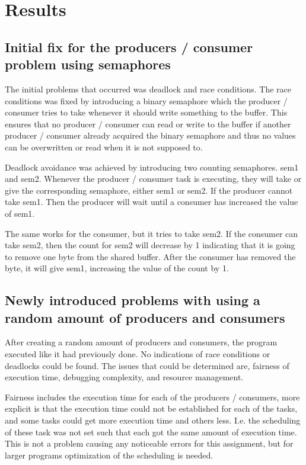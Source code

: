 \section{Results}
\label{section:results}
\subsection{Initial fix for the producers / consumer problem using semaphores}
The initial problems that occurred was deadlock and race conditions. 
The race conditions was fixed by introducing a binary semaphore which the producer / consumer tries to take whenever it should write something to the buffer. This ensures that no producer / consumer can read or write to the buffer if another producer / consumer already acquired the binary semaphore and thus no values can be overwritten or read when it is not supposed to.

Deadlock avoidance was achieved by introducing two counting semaphores. \ac{sem1} and \ac{sem2}. Whenever the producer / consumer task is executing, they will take or give the corresponding semaphore, either \ac{sem1} or \ac{sem2}. If the producer cannot take \ac{sem1}. Then the producer will wait until a consumer has increased the value of \ac{sem1}.

The same works for the consumer, but it tries to take \ac{sem2}. If the consumer can take \ac{sem2}, then the count for \ac{sem2} will decrease by 1 indicating that it is going to remove one byte from the shared buffer. After the consumer has removed the byte, it will give \ac{sem1}, increasing the value of the count by 1. 

\subsection{Newly introduced problems with using a random amount of producers and consumers}
After creating a random amount of producers and consumers, the program executed like it had previously done. No indications of race conditions or deadlocks could be found. 
The issues that could be determined are, fairness of execution time, debugging complexity, and resource management.


Fairness includes the execution time for each of the producers / consumers, more explicit is that the execution time could not be established for each of the tasks, and some tasks could get more execution time and others less. I.e. the scheduling of these task was not set such that each got the same amount of execution time. This is not a problem causing any noticeable errors for this assignment, but for larger programs optimization of the scheduling is needed. 

